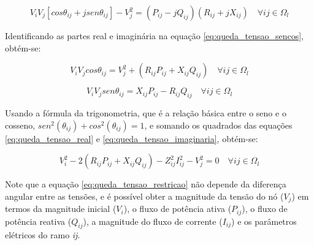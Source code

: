 \begin{equation}
    V_{i}V_{j}[cos\theta_{ij} + jsen\theta_{ij}] - V_{j}^{2} = (P_{ij} - jQ_{ij})(R_{ij} + jX_{ij}) \quad\forall ij \in \Omega_{l}
    \label{eq:queda_tensao_sencos}
\end{equation}

Identificando as partes real e imaginária na equação \ref{eq:queda_tensao_sencos}, obtém-se:

\begin{equation}
    V_{i}V_{j}cos\theta_{ij} = V_{j}^{2} + (R_{ij}P_{ij} + X_{ij}Q_{ij})\quad\forall ij \in \Omega_{l}
    \label{eq:queda_tensao_real}
\end{equation}

\begin{equation}
    V_{i}V_{j}sen\theta_{ij} = X_{ij}P_{ij} - R_{ij}Q_{ij}\quad\forall ij \in \Omega_{l}
    \label{eq:queda_tensao_imaginaria}
\end{equation}

Usando a fórmula da trigonometria, que é a relação básica entre o seno e o cosseno, $sen^{2}(\theta_{ij}) + cos^{2}(\theta_{ij}) = 1$, e somando os quadrados das equações \ref{eq:queda_tensao_real} e \ref{eq:queda_tensao_imaginaria}, obtém-se:

\begin{equation}
    V_{i}^{2} - 2(R_{ij}P_{ij} + X_{ij}Q_{ij}) - Z_{ij}^{2}I_{ij}^{2} - V_{j}^{2} = 0\quad\forall ij \in \Omega_{l}
    \label{eq:queda_tensao_restricao}
\end{equation}

Note que a equação \ref{eq:queda_tensao_restricao} não depende da diferença angular entre as tensões, e é possível obter a magnitude da tensão do nó ($V_j$) em termos da magnitude inicial ($V_i$), o fluxo de potência ativa ($P_{ij}$), o fluxo de potência reativa ($Q_{ij}$), a magnitude do fluxo de corrente ($I_{ij}$) e os parâmetros elétricos do ramo \textit{ij}.


